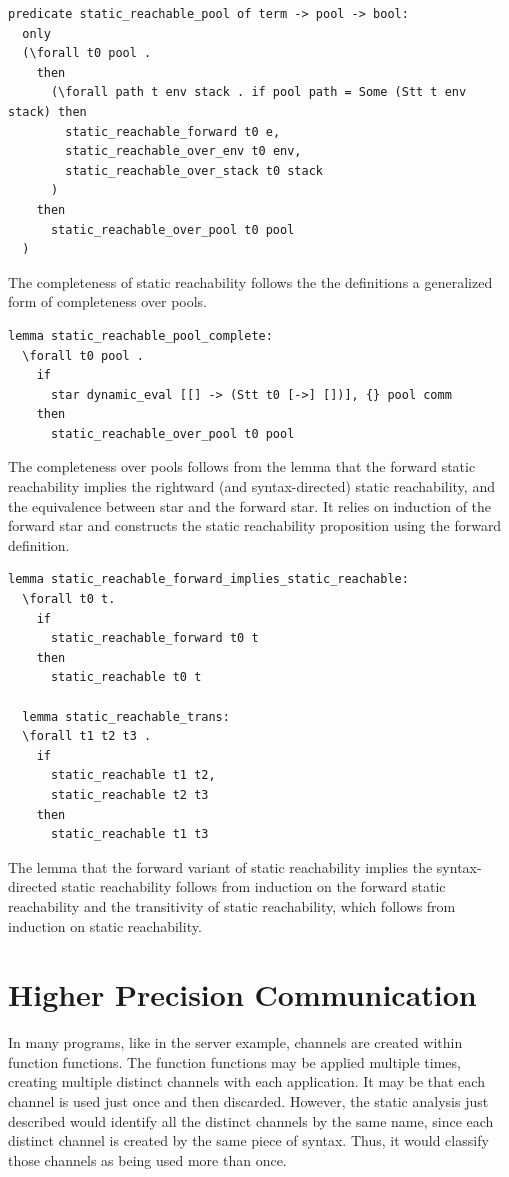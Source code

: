 \documentclass[10pt]{article}
\begin{document}
\begin{lstlisting}[language=logic, mathescape]
  predicate static_reachable_pool of term -> pool -> bool:
  only
  (\forall t0 pool .
    then
      (\forall path t env stack . if pool path = Some (Stt t env stack) then 
        static_reachable_forward t0 e, 
        static_reachable_over_env t0 env, 
        static_reachable_over_stack t0 stack
      )
    then
      static_reachable_over_pool t0 pool
  )

\end{lstlisting}

The completeness of static reachability follows the the definitions
a generalized form of completeness over pools.

\begin{lstlisting}[language=logic, mathescape]
  lemma static_reachable_pool_complete:
  \forall t0 pool .
    if
      star dynamic_eval [[] -> (Stt t0 [->] [])], {} pool comm 
    then
      static_reachable_over_pool t0 pool
\end{lstlisting}

The completeness over pools follows from the lemma that the forward
static reachability implies the rightward (and syntax-directed) static reachability,
and the equivalence between star and the forward star.  It relies on induction of the
forward star and constructs the static reachability
proposition using the forward definition.  

\begin{lstlisting}[language=logic, mathescape]
  lemma static_reachable_forward_implies_static_reachable:
  \forall t0 t. 
    if
      static_reachable_forward t0 t
    then
      static_reachable t0 t

  lemma static_reachable_trans:
  \forall t1 t2 t3 .
    if 
      static_reachable t1 t2,
      static_reachable t2 t3
    then
      static_reachable t1 t3
\end{lstlisting}

The lemma that the forward variant of static reachability implies the syntax-directed static
reachability follows from induction on the forward static reachability and the
transitivity of static reachability, which follows from induction on static reachability.

\section{Higher Precision Communication}
In many programs, like in the server example, channels are created within function functions.
The function functions may be applied multiple times, creating multiple distinct channels
with each application. It may be that each channel is used just once and then discarded.
However, the static analysis just described would identify all the distinct channels by the
same name, since each distinct channel is created by the same piece of syntax.
Thus, it would classify those channels as being used more than once.
\end{document}
